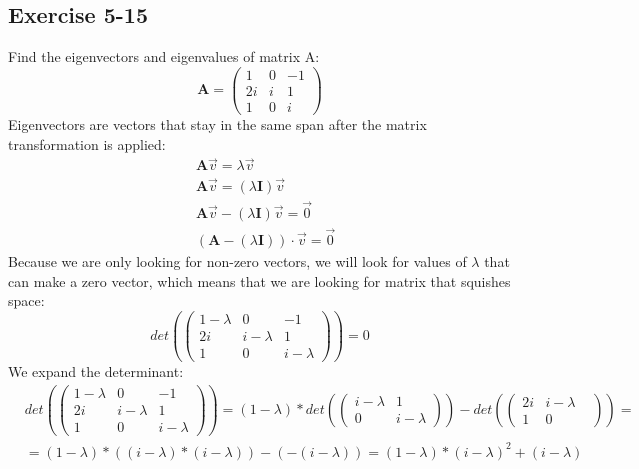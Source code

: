 \documentclass{article}
\begin{document}
        \subsection*{Exercise 5-15}
            Find the eigenvectors and eigenvalues of matrix A:
            \[
                \mathbf{A} = \begin{pmatrix}1 & 0 & -1 \\2i  & i  & 1 \\ 1 & 0 & i \end{pmatrix}
            \]
            Eigenvectors are vectors that stay in the same span after the matrix transformation is applied:
            \begin{align*}
                &\mathbf{A}\vec{v} = \lambda\vec{v} \\
                &\mathbf{A}\vec{v} = (\lambda\mathbf{I})\vec{v} \\
                &\mathbf{A}\vec{v} - (\lambda\mathbf{I})\vec{v} = \vec{0} \\
                &(\mathbf{A} - (\lambda\mathbf{I})) \cdot \vec{v} = \vec{0}
            \end{align*}
            Because we are only looking for non-zero vectors, we will look for values of $\lambda$ that can make a zero vector, which means that we are looking for matrix that squishes space:
            \[
                det\left(\begin{pmatrix}1 - \lambda  & 0 & -1 \\2i  & i - \lambda   & 1 \\ 1 & 0 & i - \lambda \end{pmatrix}\right) = 0
            \]
            We expand the determinant:
            \begin{align*}
                &det\left(\begin{pmatrix}1 - \lambda  & 0 & -1 \\2i  & i - \lambda   & 1 \\ 1 & 0 & i - \lambda \end{pmatrix}\right) = 
                (1 - \lambda) * det\left(\begin{pmatrix} i - \lambda   & 1 \\ 0 & i - \lambda\end{pmatrix}\right) - det\left(\begin{pmatrix} 2i  & i - \lambda \\ 1 & 0 & \end{pmatrix}\right) = \\
                &= (1 - \lambda) * ((i - \lambda) * (i - \lambda)) -(-(i - \lambda)) = (1 - \lambda) * (i - \lambda)^2 + (i - \lambda)
            \end{align*}
\end{document}
